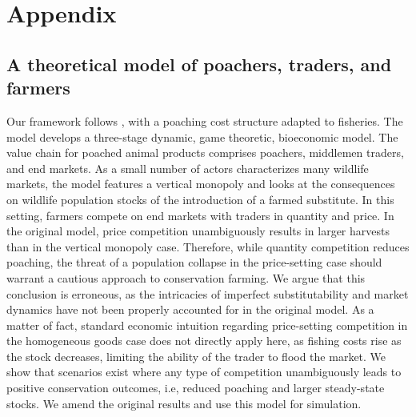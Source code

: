 \clearpage
{}
\setcounter{figure}{0}
\setcounter{table}{0}
\setcounter{equation}{0}
\renewcommand{\thesection}{\Alph{section}}
\renewcommand{\thesubsection}{\Alph{subsection}}
\renewcommand{\thefigure}{4.\Alph{figure}}
\renewcommand{\thetable}{4.\Alph{table}}


{}
\section*{Appendix}  %
\renewcommand\theequation{A.\arabic{equation}} %
\setcounter{equation}{0}
\subsection{A theoretical model of poachers, traders, and farmers}

Our framework follows \cite{damania_economics_2007}, with a poaching cost structure adapted to fisheries. The model develops a three-stage dynamic, game theoretic, bioeconomic model. The value chain for poached animal products comprises poachers, middlemen traders, and end markets. As a small number of actors characterizes many wildlife markets, the model features a vertical monopoly and looks at the consequences on wildlife population stocks of the introduction of a farmed substitute. In this setting, farmers compete on end markets with traders in quantity and price. In the original model, price competition unambiguously results in larger harvests than in the vertical monopoly case. Therefore, while quantity competition reduces poaching, the threat of a population collapse in the price-setting case should warrant a cautious approach to conservation farming. We argue that this conclusion is erroneous, as the intricacies of imperfect substitutability and market dynamics have not been properly accounted for in the original model. As a matter of fact, standard economic intuition regarding price-setting competition in the homogeneous goods case does not directly apply here, as fishing costs rise as the stock decreases, limiting the ability of the trader to flood the market. We show that scenarios exist where any type of competition unambiguously leads to positive conservation outcomes, i.e, reduced poaching and larger steady-state stocks. We amend the original results and use this model for simulation. 

